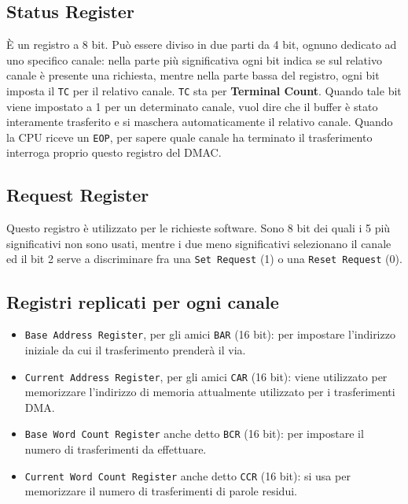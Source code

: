 \documentclass[11pt]{book}
\begin{document}
\subsection{Status Register}

\`E un registro a 8 bit. Pu\`o essere diviso in due parti da 4 bit,
ognuno dedicato ad uno specifico canale: nella parte pi\`u
significativa ogni bit indica se sul relativo canale \`e presente una
richiesta, mentre nella parte bassa del registro, ogni bit imposta il
\texttt{TC} per il relativo canale. \texttt{TC} sta per
\textbf{Terminal Count}. Quando tale bit viene impostato a 1 per un
determinato canale, vuol dire che il buffer \`e stato interamente
trasferito e si maschera automaticamente il relativo canale. Quando la
CPU riceve un {\tt EOP}, per sapere quale canale ha terminato il
trasferimento interroga proprio questo registro del DMAC.

\subsection{Request Register}

Questo registro \`e utilizzato per le richieste software. Sono 8 bit
dei quali i 5 pi\`u significativi non sono usati, mentre i due meno
significativi selezionano il canale ed il bit 2 serve a discriminare
fra una \texttt{Set Request} (1) o una \texttt{Reset Request} (0).


\subsection{Registri replicati per ogni canale}

\begin{itemize}

\item \texttt{Base Address Register}, per gli amici \texttt{BAR} (16
  bit): per impostare l'indirizzo iniziale da cui il trasferimento
  prender\`a il via.

\item \texttt{Current Address Register}, per gli amici \texttt{CAR}
  (16 bit): viene utilizzato per memorizzare l'indirizzo di memoria
  attualmente utilizzato per i trasferimenti DMA.

\item \texttt{Base Word Count Register} anche detto \texttt{BCR} (16
  bit): per impostare il numero di trasferimenti da effettuare.

\item \texttt{Current Word Count Register} anche detto \texttt{CCR}
  (16 bit): si usa per memorizzare il numero di trasferimenti di
  parole residui.

\end{itemize}
\end{document}
